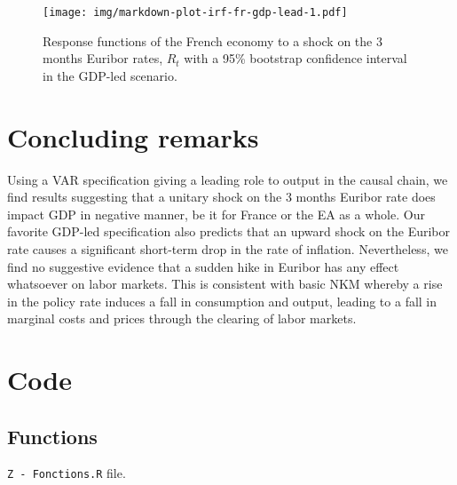 \documentclass[
  11pt,
]{article}
\begin{document}
\begin{figure}
\centering
\texttt{[image: img/markdown-plot-irf-fr-gdp-lead-1.pdf]}
\caption{\label{fig:plot-irf-fr-gdp-lead}Response functions of the French economy to a shock on the 3 months Euribor rates, \(R_t\) with a 95\% bootstrap confidence interval in the GDP-led scenario.}
\end{figure}

\newpage

\hypertarget{concluding-remarks}{%
\section{Concluding remarks}\label{concluding-remarks}}

Using a VAR specification giving a leading role to output in the causal chain, we find results suggesting that a unitary shock on the 3 months Euribor rate does impact GDP in negative manner, be it for France or the EA as a whole. Our favorite GDP-led specification also predicts that an upward shock on the Euribor rate causes a significant short-term drop in the rate of inflation. Nevertheless, we find no suggestive evidence that a sudden hike in Euribor has any effect whatsoever on labor markets. This is consistent with basic NKM whereby a rise in the policy rate induces a fall in consumption and output, leading to a fall in marginal costs and prices through the clearing of labor markets.

\newpage
\appendix

\hypertarget{sec:code}{%
\section{Code}\label{sec:code}}

\hypertarget{functions}{%
\subsection{Functions}\label{functions}}

\texttt{Z\ -\ Fonctions.R} file.
\end{document}
